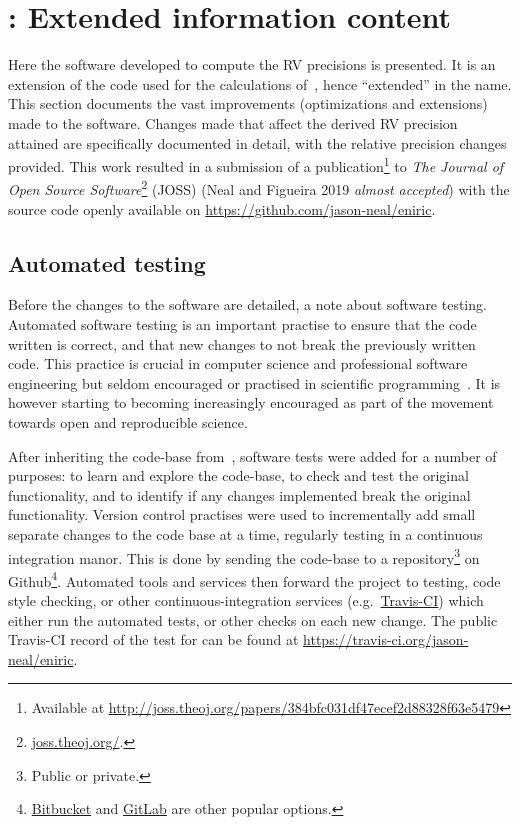 
\section{\eniric{}: Extended \nir{} information content}
\label{sec:eniric}
Here the software developed to compute the {RV} precisions is presented.
It is an extension of the code used for the calculations of~\citet{figueira_radial_2016}, hence ``extended'' in the name.
This section documents the vast improvements (optimizations and extensions) made to the software.
Changes made that affect the derived {RV} precision attained are specifically documented in detail, with the relative precision changes provided.
This work resulted in a submission of a publication\footnote{Available at \href{http://joss.theoj.org/papers/384bfc031df47ecef2d88328f63e5479}{http://joss.theoj.org/papers/384bfc031df47ecef2d88328f63e5479}} to \emph{The Journal of Open Source Software}\footnote{\href{http://joss.theoj.org/}{joss.theoj.org/}.} (JOSS) (Neal and Figueira 2019 \emph{almost accepted}) with the source code openly available on \href{Github}{https://github.com/jason-neal/eniric}.


\subsection{Automated testing}
\label{subsec:automated_testing}
Before the changes to the software are detailed, a note about software testing.
Automated software testing is an important practise to ensure that the code written is correct, and that new changes to not break the previously written code.
This practice is crucial in computer science and professional software engineering but seldom encouraged or practised in scientific programming~\citep{storer_bridging_2017}.
It is however starting to becoming increasingly encouraged as part of the movement towards open and reproducible science.

After inheriting the code-base from~\citet{figueira_radial_2016}, software tests were added for a number of purposes: to learn and explore the code-base, to check and test the original functionality, and to identify if any changes implemented break the original functionality.
Version control practises were used to incrementally add small separate changes to the code base at a time, regularly testing in a continuous integration manor.
This is done by sending the code-base to a repository\footnote{Public or private.} on Github\footnote{\href{https://bitbucket.org}{Bitbucket} and \href{https://gitlab.com}{GitLab} are other popular options.}.
Automated tools and services then forward the project to testing, code style checking, or other continuous-integration services (e.g.\ \href{https://travis-ci.com}{Travis-CI}) which either run the automated tests, or other checks on each new change.
The public Travis-CI record of the test for \eniric{} can be found at \href{https://travis-ci.org/jason-neal/eniric}{https://travis-ci.org/jason-neal/eniric}.


